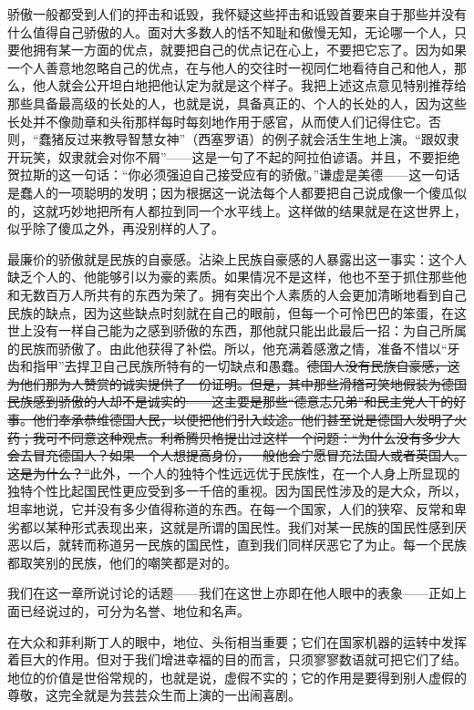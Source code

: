 \documentclass[12pt,oneside]{book}
\begin{document}
骄傲一般都受到人们的抨击和诋毁，我怀疑这些抨击和诋毁首要来自于那些并没有什么值得自己骄傲的人。面对大多数人的恬不知耻和傲慢无知，无论哪一个人，只要他拥有某一方面的优点，就要把自己的优点记在心上，不要把它忘了。因为如果一个人善意地忽略自己的优点，在与他人的交往时一视同仁地看待自己和他人，那么，他人就会公开坦白地把他认定为就是这个样子。我把上述这点意见特别推荐给那些具备最高级的长处的人，也就是说，具备真正的、个人的长处的人，因为这些长处并不像勋章和头衔那样每时每刻地作用于感官，从而使人们记得住它。否则，“蠢猪反过来教导智慧女神”（西塞罗语）的例子就会活生生地上演。“跟奴隶开玩笑，奴隶就会对你不屑”——这是一句了不起的阿拉伯谚语。并且，不要拒绝贺拉斯的这一句话：“你必须强迫自己接受应有的骄傲。”谦虚是美德——这一句话是蠢人的一项聪明的发明；因为根据这一说法每个人都要把自己说成像一个傻瓜似的，这就巧妙地把所有人都拉到同一个水平线上。这样做的结果就是在这世界上，似乎除了傻瓜之外，再没别样的人了。 

最廉价的骄傲就是民族的自豪感。沾染上民族自豪感的人暴露出这一事实：这个人缺乏个人的、他能够引以为豪的素质。如果情况不是这样，他也不至于抓住那些他和无数百万人所共有的东西为荣了。拥有突出个人素质的人会更加清晰地看到自己民族的缺点，因为这些缺点时刻就在自己的眼前，但每一个可怜巴巴的笨蛋，在这世上没有一样自己能为之感到骄傲的东西，那他就只能出此最后一招：为自己所属的民族而骄傲了。由此他获得了补偿。所以，他充满着感激之情，准备不惜以“牙齿和指甲”去捍卫自己民族所特有的一切缺点和愚蠢。\sout{德国人没有民族自豪感，这为他们那为人赞赏的诚实提供了一份证明。但是，其中那些滑稽可笑地假装为德国民族感到骄傲的人却不是诚实的——这主要是那些“德意志兄弟”和民主党人干的好事。他们奉承恭维德国人民，以便把他们引入歧途。他们甚至说是德国人发明了火药；我可不同意这种观点。利希腾贝格提出过这样一个问题：“为什么没有多少人会去冒充德国人？如果一个人想提高身份，一般他会宁愿冒充法国人或者英国人。这是为什么？”}此外，一个人的独特个性远远优于民族性，在一个人身上所显现的独特个性比起国民性更应受到多一千倍的重视。因为国民性涉及的是大众，所以，坦率地说，它并没有多少值得称道的东西。在每一个国家，人们的狭窄、反常和卑劣都以某种形式表现出来，这就是所谓的国民性。我们对某一民族的国民性感到厌恶以后，就转而称道另一民族的国民性，直到我们同样厌恶它了为止。每一个民族都取笑别的民族，他们的嘲笑都是对的。 


我们在这一章所说讨论的话题——我们在这世上亦即在他人眼中的表象——正如上面已经说过的，可分为名誉、地位和名声。 

在大众和菲利斯丁人的眼中，地位、头衔相当重要；它们在国家机器的运转中发挥着巨大的作用。但对于我们增进幸福的目的而言，只须寥寥数语就可把它们了结。地位的价值是世俗常规的，也就是说，虚假不实的；它的作用是要得到别人虚假的尊敬，这完全就是为芸芸众生而上演的一出闹喜剧。
\end{document}
